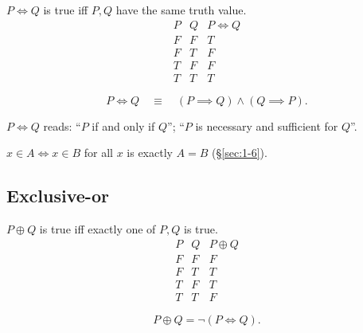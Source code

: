 \begin{definition}
$P \iff Q$ is true iff $P,Q$ have the same truth value.
\[
\begin{array}{cc|c}
P & Q & P \iff Q \\ \hline
F & F & T \\
F & T & F \\
T & F & F \\
T & T & T
\end{array}
\]
\end{definition}

\begin{proposition}
\[
P \iff Q \quad \equiv \quad (P \implies Q) \wedge (Q \implies P).
\]
\end{proposition}

\begin{note}
$P \iff Q$ reads: ``$P$ if and only if $Q$''; ``$P$ is necessary and sufficient for $Q$''.
\end{note}

\begin{note}
$x\in A \iff x\in B$ for all $x$ is exactly $A=B$ (\S\ref{sec:1-6}).
\end{note}

\subsection{Exclusive-or}
\label{sec:4-11}

\begin{definition}[Exclusive-or]
$P \oplus Q$ is true iff exactly one of $P,Q$ is true.
\[
\begin{array}{cc|c}
P & Q & P \oplus Q \\ \hline
F & F & F \\
F & T & T \\
T & F & T \\
T & T & F
\end{array}
\]
\end{definition}

\begin{proposition}
\[
P \oplus Q = \neg(P \iff Q).
\]
\end{proposition}

